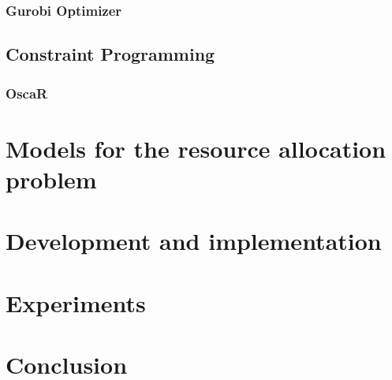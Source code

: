 \documentclass{template/EPL-master-thesis-covers-EN}
\begin{document}
  \subsection{Gurobi Optimizer}
  \label{subsection:gurobi}
  

  \section{Constraint Programming}
  

  \subsection{OscaR}
  \label{subsection:oscar}
  
  
  \chapter{Models for the resource allocation problem}
  \label{chapter:models}

  
  
  

  \chapter{Development and implementation}
  \label{chapter:implementation}
  


  \chapter{Experiments}
  \label{chapter:experiments}
  
  

  \chapter{Conclusion}
  \label{chapter:conclusion}

  

  
   
  

  \begin{appendices}

  
  
  

  \end{appendices}

  \backcoverpage
\end{document}
